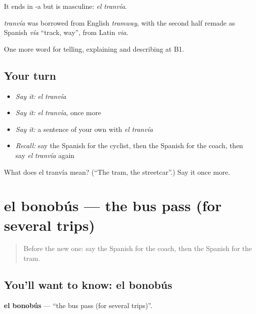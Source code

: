 It ends in -a but is masculine: \emph{el tranvía}.

\begin{cousinweb}
\emph{tranvía} was borrowed from English \emph{tramway}, with the second half remade as Spanish \emph{vía} \textquotedblleft{}track, way\textquotedblright{}, from Latin \emph{via}.
\end{cousinweb}

\begin{grammarlens}[title={What you've built}]
One more word for telling, explaining and describing at B1.
\end{grammarlens}

\subsection*{Your turn}
\begin{itemize}
\raggedright
  \item \emph{Say it:} \emph{el tranvía}
  \item \emph{Say it:} \emph{el tranvía}, once more
  \item \emph{Say it:} a sentence of your own with \emph{el tranvía}
  \item \emph{Recall:} say the Spanish for the cyclist, then the Spanish for the coach, then say \emph{el tranvía} again
\end{itemize}

\begin{tcolorbox}[breakable,colback=teal!4,colframe=teal!35!black,title={Before you move on}]
What does el tranvía mean? (\textquotedblleft{}The tram, the streetcar\textquotedblright{}.) Say it once more.
\end{tcolorbox}
\section[el bonobús]{el bonobús — the bus pass (for several trips)}

\label{lesson:ES-C650-bonobus}



\begin{quote}
Before the new one: say the Spanish for the coach, then the Spanish for the tram.
\end{quote}

\subsection*{You'll want to know: el bonobús}
\textbf{el bonobús} — \textquotedblleft{}the bus pass (for several trips)\textquotedblright{}.

